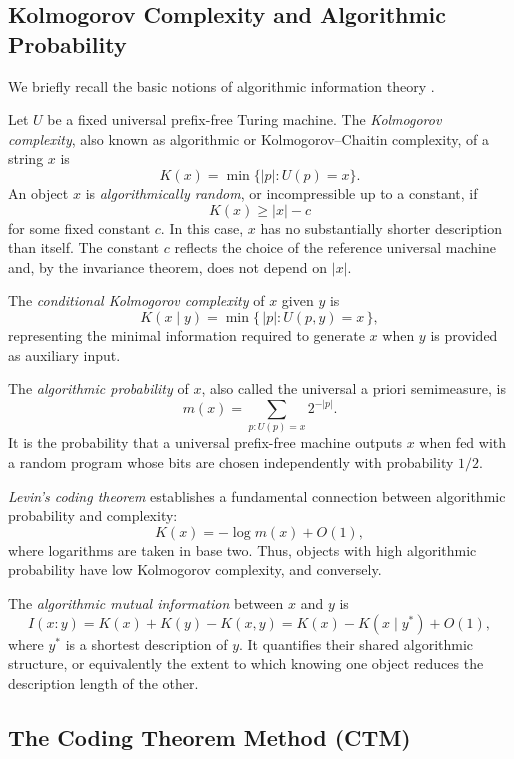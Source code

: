 \documentclass{article}
\begin{document}
\subsection{Kolmogorov Complexity and Algorithmic Probability}

We briefly recall the basic notions of algorithmic information theory \cite{kolmogorov_three_1968, chaitin_length_1969, solomonoff_formal1_1964, solomonoff_formal2_1964, li_introduction_2019}.

Let \(U\) be a fixed universal prefix-free Turing machine. The \emph{Kolmogorov complexity}, also known as algorithmic or Kolmogorov--Chaitin complexity, of a string \(x\) is
\[
K(x) = \min\{|p| : U(p)=x\}.
\]
An object \(x\) is \emph{algorithmically random}, or incompressible up to a constant, if
\[
K(x) \ge |x| - c
\]
for some fixed constant \(c\). In this case, \(x\) has no substantially shorter description than itself. The constant \(c\) reflects the choice of the reference universal machine and, by the invariance theorem, does not depend on \(|x|\).

The \emph{conditional Kolmogorov complexity} of \(x\) given \(y\) is
\[
K(x \mid y) = \min\{\,|p| : U(p,y) = x \,\},
\]
representing the minimal information required to generate \(x\) when \(y\) is provided as auxiliary input.

The \emph{algorithmic probability} of \(x\), also called the universal a priori semimeasure, is
\[
m(x) = \sum_{p : U(p) = x} 2^{-|p|}.
\]
It is the probability that a universal prefix-free machine outputs \(x\) when fed with a random program whose bits are chosen independently with probability \(1/2\).

\emph{Levin's coding theorem} \cite{levin_laws_1974} establishes a fundamental connection between algorithmic probability and complexity:
\[
K(x) = -\log m(x) + O(1),
\]
where logarithms are taken in base two. Thus, objects with high algorithmic probability have low Kolmogorov complexity, and conversely.

The \emph{algorithmic mutual information} between \(x\) and \(y\) is
\[
I(x:y)
=
K(x)+K(y)-K(x,y)
=
K(x)-K(x\mid y^*)+O(1),
\]
where \(y^*\) is a shortest description of \(y\). It quantifies their shared algorithmic structure, or equivalently the extent to which knowing one object reduces the description length of the other.


\subsection{The Coding Theorem Method (CTM)}
\end{document}
